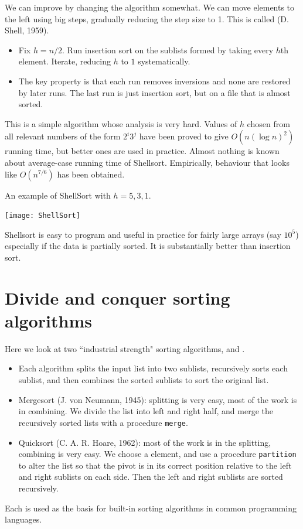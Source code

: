 We can improve by changing the algorithm somewhat.
We can move elements to the left using big steps, gradually reducing the 
step size to 1. This is called  (D. Shell, 1959). 
\begin{itemize}
\item Fix $h = n/2$. Run insertion sort on the sublists formed by taking 
every $h$th element. Iterate, reducing $h$ to $1$ systematically. 
\item The key property is that each run removes inversions and none are 
restored by later runs. The last run is just insertion sort, but on a file that 
is almost sorted.
\end{itemize}
This is a simple algorithm whose analysis is very hard. 
Values of $h$ chosen from all relevant numbers of the form $2^i 3^j$ have been proved to give 
$O(n (\log n)^2)$ running time, but better ones are used in practice. 
Almost nothing is known about average-case running time of Shellsort. 
Empirically, behaviour that looks like $O(n^{7/6})$ has been obtained. 


\begin{Example}
An example of ShellSort with $h = 5, 3, 1$.
\begin{center}
\texttt{[image: ShellSort]} 
\end{center}
\end{Example}

Shellsort is easy to program and useful in practice for fairly large arrays (say $10^5$) especially if the data is partially sorted. 
It is substantially  better than insertion sort.

\chapter{Divide and conquer sorting algorithms}  %
\label{sec:mergesort}
Here we look at two ``industrial strength" sorting algorithms,  and .
\begin{itemize}
\item Each algorithm splits the input list into two sublists, 
recursively sorts each sublist, and then combines the sorted sublists to sort 
the original list.
\item Mergesort (J. von Neumann, 1945): splitting is very easy, most 
of the work is in combining. 
We divide the list into left and right half, and merge the recursively sorted 
lists with a procedure \texttt{merge}. 
\item Quicksort (C. A. R. Hoare, 1962): most of the work is in the 
splitting, combining is very easy. We choose a  element, and use a 
procedure \texttt{partition} to alter the list so that the pivot is in its 
correct position relative to the left and right sublists on each side. Then the left and right sublists 
are sorted recursively.
\end{itemize}
Each is used as the basis for 
built-in sorting algorithms in common programming languages.

